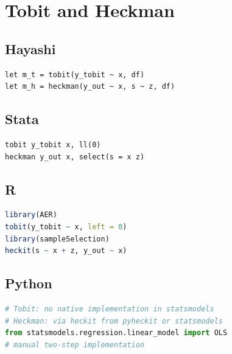 \section{Tobit and Heckman}

\subsection*{Hayashi}

\begin{lstlisting}
let m_t = tobit(y_tobit ~ x, df)
let m_h = heckman(y_out ~ x, s ~ z, df)
\end{lstlisting}

\subsection*{Stata}

\begin{lstlisting}[language={}, basicstyle=\ttfamily\small,
  frame=single, numbers=none, backgroundcolor=\color{codbg}]
tobit y_tobit x, ll(0)
heckman y_out x, select(s = x z)
\end{lstlisting}

\subsection*{R}

\begin{lstlisting}[language=R, basicstyle=\ttfamily\small,
  frame=single, numbers=none, backgroundcolor=\color{codbg},
  keywordstyle=\color{keyword}\bfseries,
  stringstyle=\color{string},
  commentstyle=\color{comment}\itshape]
library(AER)
tobit(y_tobit ~ x, left = 0)
library(sampleSelection)
heckit(s ~ x + z, y_out ~ x)
\end{lstlisting}

\subsection*{Python}

\begin{lstlisting}[language=Python, basicstyle=\ttfamily\small,
  frame=single, numbers=none, backgroundcolor=\color{codbg},
  keywordstyle=\color{keyword}\bfseries,
  stringstyle=\color{string},
  commentstyle=\color{comment}\itshape]
# Tobit: no native implementation in statsmodels
# Heckman: via heckit from pyheckit or statsmodels
from statsmodels.regression.linear_model import OLS
# manual two-step implementation
\end{lstlisting}

